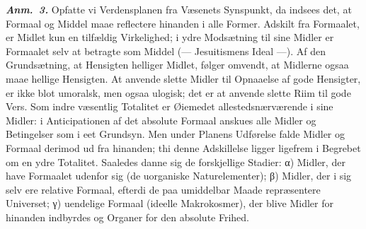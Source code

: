 \documentclass[12pt]{book}
\newcommand{\anm}[1]{\emph{\textbf{Anm.~#1.}}}
\newcommand{\opage}[1]{\marginnote{\footnotesize\textit{[#1]}}}
\begin{document}
\anm{3} Opfatte vi Verdensplanen fra Væsenets Synspunkt, da indsees
det, at Formaal og Middel maae reflectere hinanden i alle Former.
Adskilt fra Formaalet, er Midlet kun en tilfældig Virkelighed; i
ydre Modsætning til sine Midler er Formaalet selv at betragte som
Middel (--- Jesuitismens Ideal ---). Af den Grundsætning, at
Hensigten helliger Midlet, følger omvendt, at Midlerne ogsaa maae
hellige Hensigten. At anvende slette Midler til Opnaaelse af gode
Hensigter, er ikke blot umoralsk, men ogsaa ulogisk;
\opage{236} det er at anvende slette Riim til gode Vers. Som indre væsentlig
Totalitet er Øiemedet allestedsnærværende i sine Midler: i
Anticipationen af det absolute Formaal anskues alle Midler og
Betingelser som i eet Grundsyn. Men under Planens Udførelse falde
Midler og Formaal derimod ud fra hinanden; thi denne Adskillelse
ligger ligefrem i Begrebet om en ydre Totalitet. Saaledes danne sig
de forskjellige Stadier: α) Midler, der have Formaalet udenfor sig
(de uorganiske Naturelementer); β) Midler, der i sig selv ere
relative Formaal, efterdi de paa umiddelbar Maade repræsentere
Universet; γ) uendelige Formaal (ideelle Makrokosmer), der blive
Midler for hinanden indbyrdes og Organer for den absolute Frihed.
\end{document}
